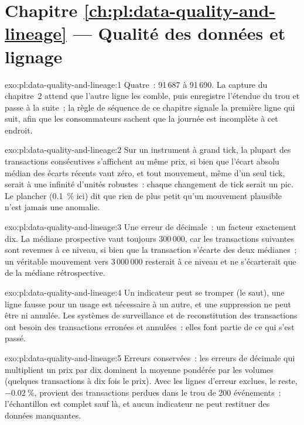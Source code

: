 \section*{Chapitre \ref{ch:pl:data-quality-and-lineage} --- Qualité des données et lignage}

\begin{solution}{exo:pl:data-quality-and-lineage:1}
Quatre~: 91\,687 à 91\,690. La capture du chapitre~2 attend que l'autre ligne les comble, puis enregistre l'étendue du trou et passe
à la suite~; la règle de séquence de ce chapitre signale la première ligne qui suit, afin que les consommateurs sachent que la journée est incomplète à cet endroit.
\end{solution}

\begin{solution}{exo:pl:data-quality-and-lineage:2}
Sur un instrument à grand tick, la plupart des transactions consécutives s'affichent au même prix, si bien que l'écart absolu médian des écarts récents vaut
zéro, et tout mouvement, même d'un seul tick, serait à une infinité d'unités robustes~: chaque changement de tick serait un pic. Le plancher (0.1~\%
ici) dit que rien de plus petit qu'un mouvement plausible n'est jamais une anomalie.
\end{solution}

\begin{solution}{exo:pl:data-quality-and-lineage:3}
Une erreur de décimale~: un facteur exactement dix. La médiane prospective vaut toujours 300\,000, car les transactions suivantes sont revenues à ce niveau, si bien que la
transaction s'écarte des deux médianes~; un véritable mouvement vers 3\,000\,000 resterait à ce niveau et ne s'écarterait que de la médiane rétrospective.
\end{solution}

\begin{solution}{exo:pl:data-quality-and-lineage:4}
Un indicateur peut se tromper (le saut), une ligne fausse pour un usage est nécessaire à un autre, et une suppression ne peut être ni
annulée. Les systèmes de surveillance et de reconstitution des transactions ont besoin des transactions erronées et annulées~: elles font partie de ce qui s'est passé.
\end{solution}

\begin{solution}{exo:pl:data-quality-and-lineage:5}
Erreurs conservées~: les erreurs de décimale qui multiplient un prix par dix dominent la moyenne pondérée par les volumes (quelques transactions à dix fois le prix). Avec
les lignes d'erreur exclues, le reste, $-0.02~\%$, provient des transactions perdues dans le trou de 200 événements~: l'échantillon est complet sauf là,
et aucun indicateur ne peut restituer des données manquantes.
\end{solution}

